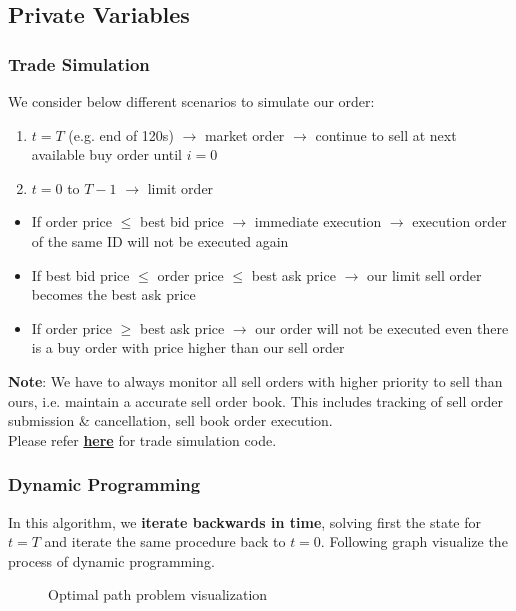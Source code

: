 \documentclass[12pt]{extarticle}
\begin{document}
\subsection{Private Variables} \label{private-variables}

\subsubsection{Trade Simulation}
We consider below different scenarios to simulate our order:
\begin{enumerate}
 \item $t = T$ (e.g. end of 120s) $\rightarrow$ market order $\rightarrow$ continue to sell at next available buy order until $i=0$
 \item $t = 0$ to $T-1$ $\rightarrow$ limit order
\end{enumerate}
 \begin{itemize}
 \item If order price $\leqslant$ best bid price $\rightarrow$ immediate execution $\rightarrow$ execution order of the same ID will not be executed again
 \item If best bid price $\leqslant$ order price $\leqslant$ best ask price $\rightarrow$ our limit sell order becomes the best ask price
 \item If order price $\geqslant$ best ask price $\rightarrow$ our order will not be executed even there is a buy order with price higher than our sell order
 \end{itemize}
\textbf{Note}: We have to always monitor all sell orders with higher priority to sell than ours, i.e. maintain a accurate sell order book. This includes tracking of sell order submission \& cancellation, sell book order execution.
\\Please refer \href{https://github.com/wangkunzhen/Machine-Learning-5225/blob/master/ExecutionEngine.py}{\textbf{here}} for trade simulation code.

\subsubsection{Dynamic Programming}

In this algorithm, we \textbf{iterate backwards in time}, solving first the state for $t = T$ and iterate the same procedure back to $t = 0$. Following graph visualize the process of dynamic programming.

\begin{figure}[H]
\caption{Optimal path problem visualization}
\end{figure}
\end{document}
